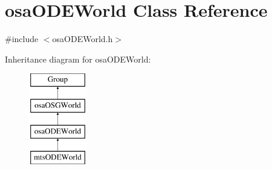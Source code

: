 \hypertarget{classosa_o_d_e_world}{}\section{osa\+O\+D\+E\+World Class Reference}
\label{classosa_o_d_e_world}


{\ttfamily \#include $<$osa\+O\+D\+E\+World.\+h$>$}

Inheritance diagram for osa\+O\+D\+E\+World\+:\begin{figure}[H]
\begin{center}
\leavevmode
\includegraphics[height=4.000000cm]{d6/d94/classosa_o_d_e_world}
\end{center}
\end{figure}
